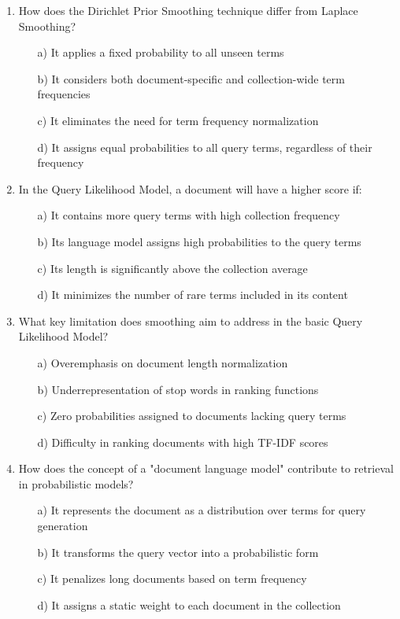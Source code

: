 \documentclass[8pt]{extarticle}
\begin{document}
\begin{multicols}{2}
\begin{enumerate}
\item How does the Dirichlet Prior Smoothing technique differ from Laplace Smoothing?
\begin{itemize}
    \item[a)] It applies a fixed probability to all unseen terms
    \item[b)] It considers both document-specific and collection-wide term frequencies
    \item[c)] It eliminates the need for term frequency normalization
    \item[d)] It assigns equal probabilities to all query terms, regardless of their frequency
\end{itemize}
 

\item In the Query Likelihood Model, a document will have a higher score if:
\begin{itemize}
    \item[a)] It contains more query terms with high collection frequency
    \item[b)] Its language model assigns high probabilities to the query terms
    \item[c)] Its length is significantly above the collection average
    \item[d)] It minimizes the number of rare terms included in its content
\end{itemize}
 

\item What key limitation does smoothing aim to address in the basic Query Likelihood Model?
\begin{itemize}
    \item[a)] Overemphasis on document length normalization
    \item[b)] Underrepresentation of stop words in ranking functions
    \item[c)] Zero probabilities assigned to documents lacking query terms
    \item[d)] Difficulty in ranking documents with high TF-IDF scores
\end{itemize}
 

\item How does the concept of a "document language model" contribute to retrieval in probabilistic models?
\begin{itemize}
    \item[a)] It represents the document as a distribution over terms for query generation
    \item[b)] It transforms the query vector into a probabilistic form
    \item[c)] It penalizes long documents based on term frequency
    \item[d)] It assigns a static weight to each document in the collection
\end{itemize}
 


\end{enumerate}
\end{multicols}
\end{document}
